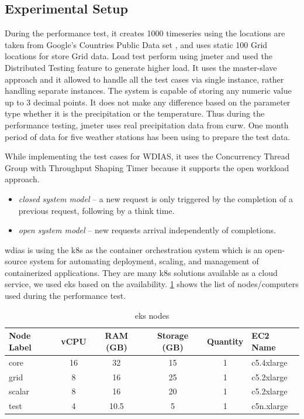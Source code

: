 \documentclass[conference]{IEEEtran}
\begin{document}
\subsection{Experimental Setup}
\label{psubse:experimental_setup}

During the performance test, it creates 1000 timeseries using the locations are taken from Google's Countries Public Data set \cite{GoogleGoogleCounties}, and uses static 100 Grid locations for store Grid data. Load test perform using \acrshort{jmeter} and used the Distributed Testing feature to generate higher load. It uses the master-slave approach and it allowed to handle all the test cases via single instance, rather handling separate instances. The system is capable of storing any numeric value up to 3 decimal points. It does not make any difference based on the parameter type whether it is the precipitation or the temperature. Thus during the performance testing, \acrshort{jmeter} uses real precipitation data from \acrshort{curw}. One month period of data for five weather stations has been using to prepare the test data.

While implementing the test cases for WDIAS, it uses the Concurrency Thread Group
with Throughput Shaping Timer because it supports the open workload approach.

\begin{itemize}
    \item \emph{closed system model} \cite{Haggett1998AnWales} -- a new request is only triggered by the completion of a previous request, following by a think time.
    \item \emph{open system model} -- new requests arrival independently of completions.
\end{itemize}

\acrshort{wdias} is using the \acrfull{k8s} as the container orchestration system which is an open-source system for automating deployment, scaling, and management of containerized applications. They are many \acrshort{k8s} solutions available as a cloud service, we used \acrfull{eks} based on the availability. \cref{ptab:aws_eks_nodes} shows the list of nodes/computers used during the performance test.

\begin{table}[ht]
\centering
\caption{\acrshort{eks} nodes}
\begin{adjustbox}{width=0.45\textwidth}
\footnotesize
\begin{tabular}{|l|c|c|c|c|l|}
\hline
\textbf{Node Label} & \textbf{vCPU} & \textbf{RAM (GB)} & \textbf{Storage (GB)} & \textbf{Quantity} & \textbf{EC2 Name} \\ \hline
core & 16 & 32 & 15 & 1 & c5.4xlarge \\ \hline
grid & 8 & 16 & 25 & 1 & c5.2xlarge \\ \hline
scalar & 8 & 16 & 20 & 1 & c5.2xlarge \\ \hline
test & 4 & 10.5 & 5 & 1 & c5n.xlarge \\ \hline
\end{tabular}
\end{adjustbox}
\label{ptab:aws_eks_nodes}
\end{table}
\end{document}
